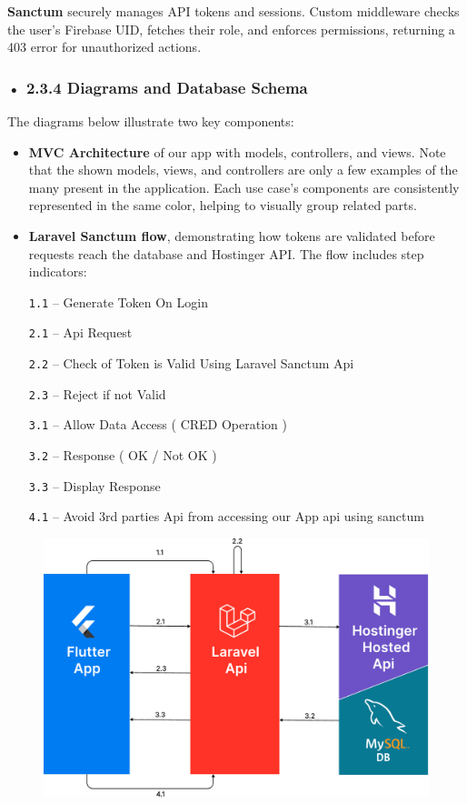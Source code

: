 \documentclass[12pt]{report}
\begin{document}
\noindent \textbf{Sanctum} securely manages API tokens and sessions. Custom middleware checks the user’s Firebase UID, fetches their role, and enforces permissions, returning a 403 error for unauthorized actions.

\vspace{0.5cm}

\subsubsection*{• 2.3.4 Diagrams and Database Schema}

The diagrams below illustrate two key components:
\begin{itemize}
	\item \textbf{MVC Architecture} of our app with models, controllers, and views. Note that the shown models, views, and controllers are only a few examples of the many present in the application. Each use case’s components are consistently represented in the same color, helping to visually group related parts.
	\item \textbf{Laravel Sanctum flow}, demonstrating how tokens are validated before requests reach the database and Hostinger API. The flow includes step indicators:

	      \par \texttt{1.1} – Generate Token On Login
	      \par \texttt{2.1} – Api Request
	      \par \texttt{2.2} – Check of Token is Valid Using Laravel Sanctum Api
	      \par \texttt{2.3} – Reject if not Valid
	      \par \texttt{3.1} – Allow Data Access ( CRED Operation )
	      \par \texttt{3.2} – Response ( OK / Not OK )
	      \par \texttt{3.3} – Display Response
	      \par \texttt{4.1} – Avoid 3rd parties Api from accessing our App api using sanctum

\end{itemize}
\vspace*{0.4cm}
\begin{figure}[H]
	\centering
	\includegraphics[width=1\textwidth]{images/sanctum@2x.pdf}
\end{figure}
\end{document}
